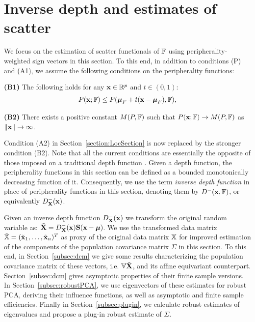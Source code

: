 \section{Inverse depth and estimates of scatter}
\label{section:dcmSection}
We focus on the estimation of scatter functionals of ${\mathbb{F}}$ using peripherality-weighted sign vectors in this section. To this end, in addition to conditions (P) and (A1), we assume the following conditions on the peripherality functions:

\vspace{1em}
\noindent\textbf{(B1)} The following holds for any ${\bf{x}} \in {\mathbb{R}}^p$ and $t \in (0,1)$:
%
$$
P({\bf{x}}; {\mathbb{F}}) \leq P({\boldsymbol{\mu}}_F + t({\bf{x}} - {\boldsymbol{\mu}}_F), {\mathbb{F}}),
$$
%

\noindent\textbf{(B2)} There exists a positive constant $M(P,{\mathbb{F}}) $ such that $P({\bf{x}}; {\mathbb{F}}) \rightarrow M(P,{\mathbb{F}})$ as $\|{\bf{x}}\| \rightarrow \infty $.
\vspace{1em}

Condition (A2) in Section~\ref{section:LocSection} is now replaced by the stronger condition (B2). Note that all the current conditions are essentially the opposite of those imposed on a traditional depth function \citep{zuo00}. Given a depth function, the peripherality functions in this section can be defined as a bounded monotonically decreasing function of it. Consequently, we use the term {\it inverse depth function} in place of peripherality functions in this section, denoting them by $D^-({\bf{x}},{\mathbb{F}})$, or equivalently $D^-_{\mathbf{X}}({\bf{x}})$.

Given an inverse depth function $D^-_{{\mathbf{X}}}({\bf{x}})$ we transform the original random variable as: $\tilde {{\mathbf{X}}} = D^-_{\mathbf{X}}({\bf{x}}) {\mathbf{S}}({\bf{x}} - {\boldsymbol{\mu}})$. We use the transformed data matrix $\tilde {{\mathbb{X}}} = (\tilde {{\bf{x}}}_1, \ldots, \tilde {{\bf{x}}}_n)^T$ as proxy of the original data matrix ${\mathbb{X}}$ for improved estimation of the components of the population covariance matrix $\Sigma$ in this section. To this end, in Section~\ref{subsec:dcm} we give some results characterizing the population covariance matrix of these vectors, i.e. ${\mathbb{V}} \tilde {{\mathbf{X}}}$, and its affine equivariant counterpart. Section~\ref{subsec:dcm} gives asymptotic properties of their finite sample versions. In Section~\ref{subsec:robustPCA}, we use eigenvectors of these estimates for robust PCA, deriving their influence functions, as well as asymptotic and finite sample efficiencies. Finally in Section~\ref{subsec:plugin}, we calculate robust estimates of eigenvalues and propose a plug-in robust estimate of $\Sigma$.

